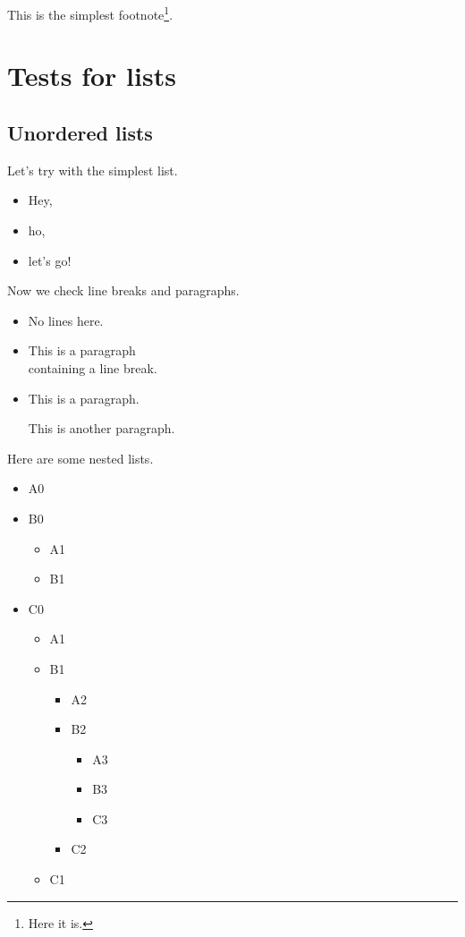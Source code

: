 \documentclass{Metanorma}
\begin{document}
  This is the simplest footnote\footnote{Here it is.}.

  \section{Tests for lists}

  \subsection{Unordered lists}

  Let's try with the simplest list.

  \begin{itemize}
    \item Hey,
    \item ho,
    \item let's go!
  \end{itemize}

  Now we check line breaks and paragraphs.

  \begin{itemize}
    \item No lines here.

    \item This is a paragraph\\
          containing a line break.

    \item This is a paragraph.

          This is another paragraph.
  \end{itemize}

  Here are some nested lists.

  \begin{itemize}
    \item A0
    \item B0
    \begin{itemize}
      \item A1
      \item B1
    \end{itemize}
    \item C0
    \begin{itemize}
      \item A1
      \item B1
      \begin{itemize}
        \item A2
        \item B2
        \begin{itemize}
          \item A3
          \item B3
          \item C3
        \end{itemize}
        \item C2
      \end{itemize}
      \item C1
    \end{itemize}
  \end{itemize}
\end{document}

